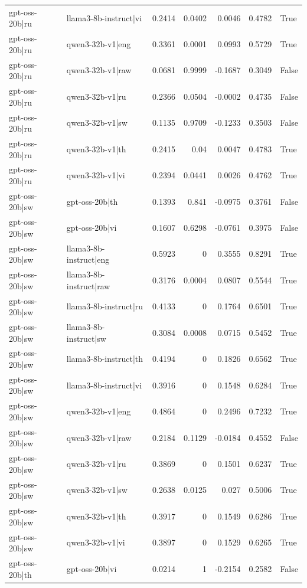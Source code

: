 \begin{table}
\begin{tabular}{l l r r r r l}
gpt-oss-20b|ru & llama3-8b-instruct|vi & 0.2414 & 0.0402 & 0.0046 & 0.4782 & True \\
gpt-oss-20b|ru & qwen3-32b-v1|eng & 0.3361 & 0.0001 & 0.0993 & 0.5729 & True \\
gpt-oss-20b|ru & qwen3-32b-v1|raw & 0.0681 & 0.9999 & -0.1687 & 0.3049 & False \\
gpt-oss-20b|ru & qwen3-32b-v1|ru & 0.2366 & 0.0504 & -0.0002 & 0.4735 & False \\
gpt-oss-20b|ru & qwen3-32b-v1|sw & 0.1135 & 0.9709 & -0.1233 & 0.3503 & False \\
gpt-oss-20b|ru & qwen3-32b-v1|th & 0.2415 & 0.04 & 0.0047 & 0.4783 & True \\
gpt-oss-20b|ru & qwen3-32b-v1|vi & 0.2394 & 0.0441 & 0.0026 & 0.4762 & True \\
gpt-oss-20b|sw & gpt-oss-20b|th & 0.1393 & 0.841 & -0.0975 & 0.3761 & False \\
gpt-oss-20b|sw & gpt-oss-20b|vi & 0.1607 & 0.6298 & -0.0761 & 0.3975 & False \\
gpt-oss-20b|sw & llama3-8b-instruct|eng & 0.5923 & 0 & 0.3555 & 0.8291 & True \\
gpt-oss-20b|sw & llama3-8b-instruct|raw & 0.3176 & 0.0004 & 0.0807 & 0.5544 & True \\
gpt-oss-20b|sw & llama3-8b-instruct|ru & 0.4133 & 0 & 0.1764 & 0.6501 & True \\
gpt-oss-20b|sw & llama3-8b-instruct|sw & 0.3084 & 0.0008 & 0.0715 & 0.5452 & True \\
gpt-oss-20b|sw & llama3-8b-instruct|th & 0.4194 & 0 & 0.1826 & 0.6562 & True \\
gpt-oss-20b|sw & llama3-8b-instruct|vi & 0.3916 & 0 & 0.1548 & 0.6284 & True \\
gpt-oss-20b|sw & qwen3-32b-v1|eng & 0.4864 & 0 & 0.2496 & 0.7232 & True \\
gpt-oss-20b|sw & qwen3-32b-v1|raw & 0.2184 & 0.1129 & -0.0184 & 0.4552 & False \\
gpt-oss-20b|sw & qwen3-32b-v1|ru & 0.3869 & 0 & 0.1501 & 0.6237 & True \\
gpt-oss-20b|sw & qwen3-32b-v1|sw & 0.2638 & 0.0125 & 0.027 & 0.5006 & True \\
gpt-oss-20b|sw & qwen3-32b-v1|th & 0.3917 & 0 & 0.1549 & 0.6286 & True \\
gpt-oss-20b|sw & qwen3-32b-v1|vi & 0.3897 & 0 & 0.1529 & 0.6265 & True \\
gpt-oss-20b|th & gpt-oss-20b|vi & 0.0214 & 1 & -0.2154 & 0.2582 & False \\

\end{tabular}
\end{table}
